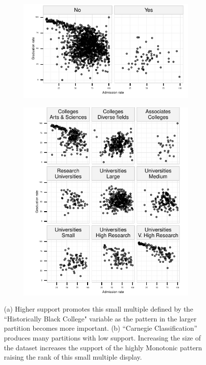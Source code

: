 \begin{figure}
 \centering 
 	 \begin{subfigure}{3.5in}
		\includegraphics[width=3.5in]{images/Historically_Black_College.pdf}
		  \caption{}
		 \label{fig:support1}
 	\end{subfigure}
 	 \begin{subfigure}{3.5in}
		\includegraphics[width=3.5in]{images/Carnegie_Classification.pdf}
		  \caption{}
		 \label{fig:support2}
 	\end{subfigure}
	\caption{(a) Higher support promotes this small multiple defined by the ``Historically Black College" variable as the pattern in the larger partition becomes more important. (b) ``Carnegie Classification'' produces many partitions with low support. Increasing the size of the dataset increases the support of the highly Monotonic pattern raising the rank of this small multiple display.}
\end{figure}


